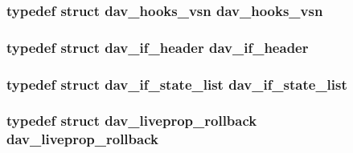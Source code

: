 \subsubsection[{\texorpdfstring{dav\+\_\+hooks\+\_\+vsn}{dav_hooks_vsn}}]{\setlength{\rightskip}{0pt plus 5cm}typedef struct {\bf dav\+\_\+hooks\+\_\+vsn} {\bf dav\+\_\+hooks\+\_\+vsn}}\hypertarget{group__MOD__DAV_gad49c563d300f2c0c8a83916f375be9a7}{}\label{group__MOD__DAV_gad49c563d300f2c0c8a83916f375be9a7}
\subsubsection[{\texorpdfstring{dav\+\_\+if\+\_\+header}{dav_if_header}}]{\setlength{\rightskip}{0pt plus 5cm}typedef struct {\bf dav\+\_\+if\+\_\+header}  {\bf dav\+\_\+if\+\_\+header}}\hypertarget{group__MOD__DAV_ga1a21f29b09e55f34321b710885506fd4}{}\label{group__MOD__DAV_ga1a21f29b09e55f34321b710885506fd4}
\subsubsection[{\texorpdfstring{dav\+\_\+if\+\_\+state\+\_\+list}{dav_if_state_list}}]{\setlength{\rightskip}{0pt plus 5cm}typedef struct {\bf dav\+\_\+if\+\_\+state\+\_\+list}  {\bf dav\+\_\+if\+\_\+state\+\_\+list}}\hypertarget{group__MOD__DAV_gaf195143ed1d91d770e93caed11ce5ce5}{}\label{group__MOD__DAV_gaf195143ed1d91d770e93caed11ce5ce5}
\subsubsection[{\texorpdfstring{dav\+\_\+liveprop\+\_\+rollback}{dav_liveprop_rollback}}]{\setlength{\rightskip}{0pt plus 5cm}typedef struct {\bf dav\+\_\+liveprop\+\_\+rollback} {\bf dav\+\_\+liveprop\+\_\+rollback}}\hypertarget{group__MOD__DAV_gafa19778d61300befd3b972a18cd564d5}{}\label{group__MOD__DAV_gafa19778d61300befd3b972a18cd564d5}
